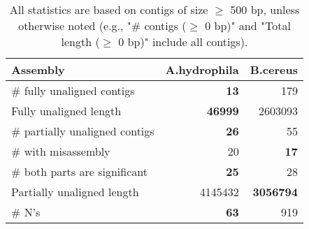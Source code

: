 \documentclass[12pt,a4paper]{article}
\begin{document}
\begin{table}[ht]
\begin{center}
\caption{All statistics are based on contigs of size $\geq$ 500 bp, unless otherwise noted (e.g., "\# contigs ($\geq$ 0 bp)" and "Total length ($\geq$ 0 bp)" include all contigs).}
\begin{tabular}{|l*{2}{|r}|}
\hline
Assembly & A.hydrophila & B.cereus \\ \hline
\# fully unaligned contigs & {\bf 13} & 179 \\ \hline
Fully unaligned length & {\bf 46999} & 2603093 \\ \hline
\# partially unaligned contigs & {\bf 26} & 55 \\ \hline
\hspace{5mm}\# with misassembly & 20 & {\bf 17} \\ \hline
\hspace{5mm}\# both parts are significant & {\bf 25} & 28 \\ \hline
Partially unaligned length & 4145432 & {\bf 3056794} \\ \hline
\# N's & {\bf 63} & 919 \\ \hline
\end{tabular}
\end{center}
\end{table}
\end{document}
